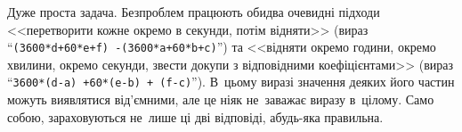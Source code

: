 \Tutorial
Дуже проста задача. Без\nolinebreak[3] проблем працюють обидва очевидні підходи <<перетворити кожне окремо в секунди, потім відняти>> (вираз ``\texttt{\mbox{(3600*d+60*e+f)}~-\nolinebreak[2] \mbox{(3600*a+60*b+c)}}'') та <<відняти окремо години, окремо хвилини, окремо секунди, звести докупи з відповідними коефіцієнтами>> (вираз ``\texttt{\mbox{3600*(d-a)}~+\nolinebreak[2] \mbox{60*(e-b)}~+ \mbox{(f-c)}}''). В~цьому виразі значення деяких його частин можуть виявлятися від'ємними, але це ніяк не~заважає виразу в~цілому. Само собою, зараховуються не~лише ці дві відповіді, а\nolinebreak[2] будь-яка правильна.